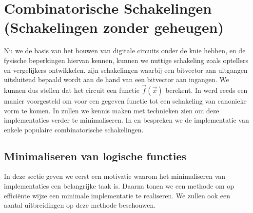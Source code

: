 \chapter{Combinatorische Schakelingen (Schakelingen zonder geheugen)}

\begin{chapterintro}
Nu we de basis van het bouwen van digitale circuits onder de knie hebben, en de fysische beperkingen hiervan kennen, kunnen we nuttige schakeling zoals optellers en vergelijkers ontwikkelen.  zijn schakelingen waarbij een bitvector aan uitgangen uitsluitend bepaald wordt aan de hand van een bitvector aan ingangen. We kunnen dus stellen dat het circuit een functie $\vec{f}(\vec{x})$ berekent. In  werd reeds een manier voorgesteld om voor een gegeven functie tot een schakeling van canonieke vorm te komen. In  zullen we kennis maken met technieken zien om deze implementaties verder te minimaliseren. In  en  bespreken we de implementatie van enkele populaire combinatorische schakelingen.
\end{chapterintro}

\minitoc[n]

\section{Minimaliseren van logische functies}

In deze sectie geven we eerst een motivatie waarom het minimaliseren van implementaties een belangrijke taak is. Daarna tonen we een methode om op effici\"ente wijze een minimale implementatie te realiseren. We zullen ook een aantal uitbreidingen op deze methode beschouwen.

